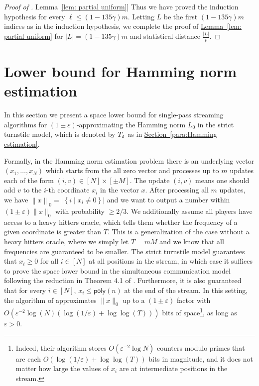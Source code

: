 \documentclass[11pt]{article}
\numberwithin{equation}{section}
\theoremstyle{definition}
\theoremstyle{plain}
\newcommand{\expref}[2]{\hyperref[#2]{#1~\ref{#2}}}
\newcommand{\set}[1]{{\left \{{#1} \right \}}}
\newcommand{\norm}[1]{{\left\| {#1} \right \|}}
\newcommand{\st}{\;|\;}
\newcommand{\poly}{\mathsf{poly}}
\newcommand{\gap}{\ensuremath{\varepsilon}}
\newcommand{\bigo}[1]{\ensuremath{{{O} \left( {#1} \right)}}}
\newcommand{\hest}{ \textsc{T} }
\begin{document}
\begin{proof}[Proof of \expref{Lemma}{lem: partial uniform}]
Thus we have proved the induction hypothesis for every $\ell \le (1-135\gamma) m$.
%
Letting %
$L$ be the first $(1-135\gamma) m$ indices as in the induction hypothesis, 
we complete the proof of \expref{Lemma}{lem: partial uniform} for $|L|= (1-135\gamma) m$ and statistical distance $\frac{|L|}{p}$.
\end{proof}


\section{Lower bound for Hamming norm estimation}
\label{sec:lower bound L0}

In this section we present a space lower bound for single-pass streaming algorithms for $(1\pm \gap)$-approximating the Hamming norm $L_0$ in the strict turnstile model,  which is denoted by $\hest_{\gap}$ as in \expref{Section}{para:Hamming estimation}.

Formally, in the Hamming norm estimation problem there is an underlying vector $(x_1,\dots, x_N)$ which starts from the all zero vector and processes up to $m$ updates each of the form $(i,v)\in [N]\times [\pm M]$.
The update $(i,v)$ means one should add $v$ to the $i$-th coordinate $x_i$ in the vector $x$. 
After processing all $m$ updates, we have $\norm{x}_0 =|\set{i\st x_i\ne 0}|$ and we want to output a number within $(1\pm\gap)\|x\|_0$ with probability $\ge 2/3$. We additionally assume all players have access to a heavy hitters oracle, which tells them whether the frequency of a given coordinate is greater than $T$. This is a generalization of the case without a heavy hitters oracle, where we simply let $T = mM$ and we know that all frequencies are guaranteed to be smaller.
The strict turnstile model guarantees that $x_i \geq 0$ for all $i \in [N]$ at all positions in the stream,
in which case it suffices to prove the space lower bound in the simultaneous communication model following the reduction in Theorem 4.1 of \cite{AHLW16}.
Furthermore, it is also guaranteed that for every $i \in [N]$,  $x_i \leq \poly(n)$ at the end of the stream. 
In this setting, the algorithm of \cite{KNW10} approximates $\|x\|_0$ up to a $(1 \pm \gap)$ factor with $\bigo{\gap^{-2}\log(N) \left(\log(1/\gap) + \log \log (T) \right)}$ bits of space\footnote{Indeed, their algorithm stores $\bigo{\gap^{-2}\log N}$ counters modulo primes that are each $\bigo{\log(1/\gap) + \log \log (T)}$ bits in magnitude, and it does not matter how large the values of $x_i$ are at intermediate positions in the stream. }, as long as $\gap > 0$.
\end{document}

